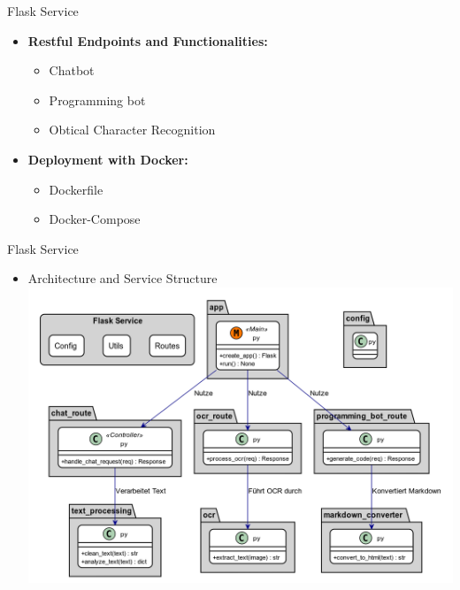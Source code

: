 \documentclass{beamer}
\begin{document}
\begin{frame}{Flask Service}
  \begin{itemize}
    \item \textbf{Restful Endpoints and Functionalities:}
    \begin{itemize}
      \item Chatbot 
      \item Programming bot
      \item Obtical Character Recognition 
    \end{itemize}
    \item \textbf{Deployment with Docker:}
    \begin{itemize}
      \item Dockerfile
      \item Docker-Compose
    \end{itemize}
  \end{itemize}
\end{frame}

\begin{frame}{Flask Service}
  \begin{itemize}
    \item Architecture and Service Structure
    \includegraphics[width=\textwidth]{flask_service.png}
  \end{itemize}
\end{frame}
\end{document}
